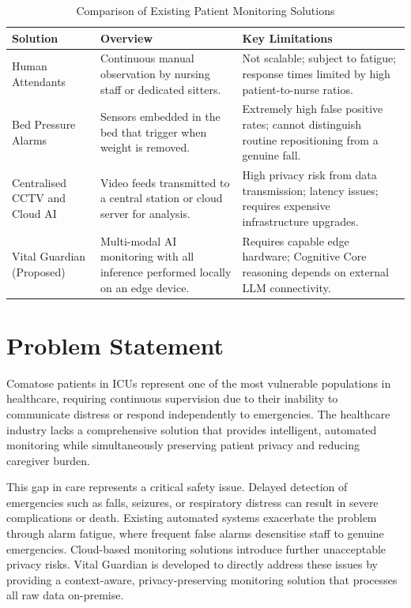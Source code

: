 \begin{table}[H]
    \centering
    \caption{Comparison of Existing Patient Monitoring Solutions}
    \label{tab:existing_solutions}
    \renewcommand{\arraystretch}{1.5}
    \begin{tabular}{|p{3.5cm}|p{5cm}|p{5cm}|}
    \hline
    \textbf{Solution} & \textbf{Overview} & \textbf{Key Limitations} \\ \hline
    Human Attendants &
    Continuous manual observation by nursing staff or dedicated sitters. &
    Not scalable; subject to fatigue; response times limited by
    high patient-to-nurse ratios. \\ \hline
    Bed Pressure Alarms &
    Sensors embedded in the bed that trigger when weight is removed. &
    Extremely high false positive rates; cannot distinguish routine
    repositioning from a genuine fall. \\ \hline
    Centralised CCTV and Cloud AI &
    Video feeds transmitted to a central station or cloud server for analysis. &
    High privacy risk from data transmission; latency issues; requires
    expensive infrastructure upgrades. \\ \hline
    Vital Guardian (Proposed) &
    Multi-modal AI monitoring with all inference performed locally on an edge device. &
    Requires capable edge hardware; Cognitive Core reasoning depends on
    external LLM connectivity. \\ \hline
    \end{tabular}
\end{table}

\section{Problem Statement}
\label{sec:problem_statement}

Comatose patients in ICUs represent one of the most vulnerable populations in
healthcare, requiring continuous supervision due to their inability to communicate
distress or respond independently to emergencies. The healthcare industry lacks a
comprehensive solution that provides intelligent, automated monitoring while
simultaneously preserving patient privacy and reducing caregiver burden.

This gap in care represents a critical safety issue. Delayed detection of
emergencies such as falls, seizures, or respiratory distress can result in severe
complications or death. Existing automated systems exacerbate the problem through
alarm fatigue, where frequent false alarms desensitise staff to genuine
emergencies. Cloud-based monitoring solutions introduce further unacceptable
privacy risks. Vital Guardian is developed to directly address these issues by
providing a context-aware, privacy-preserving monitoring solution that processes
all raw data on-premise.

